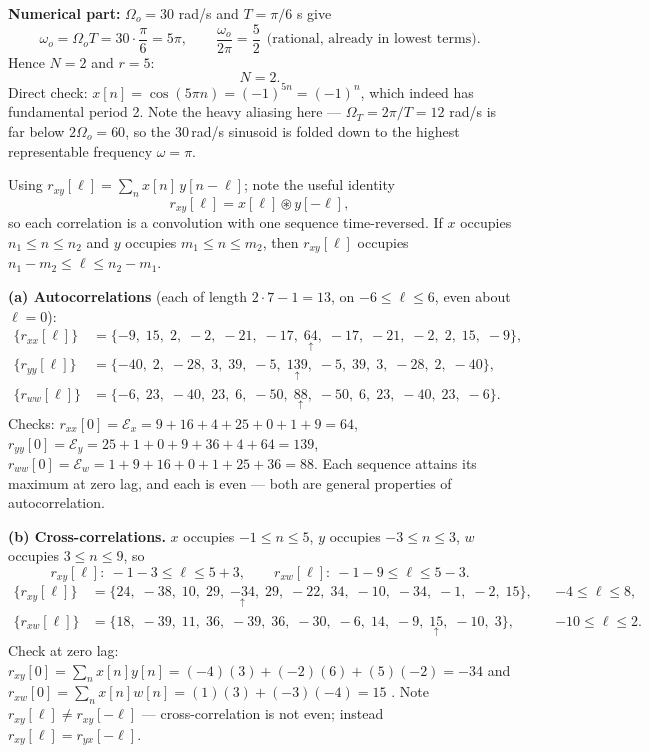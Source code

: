 \textbf{Numerical part:} $\Omega_o=30$ rad/s and $T=\pi/6$ s give
\[
\omega_o=\Omega_o T=30\cdot\frac{\pi}{6}=5\pi,
\qquad \frac{\omega_o}{2\pi}=\frac{5}{2}\ \ \text{(rational, already in lowest terms)} .
\]
Hence $N=2$ and $r=5$:
\[
\boxed{\;N=2 .\;}
\]
Direct check: $x[n]=\cos(5\pi n)=(-1)^{5n}=(-1)^{n}$, which indeed has fundamental period 2.
Note the heavy aliasing here --- $\Omega_T=2\pi/T=12$ rad/s is far below $2\Omega_o=60$, so
the $30$\,rad/s sinusoid is folded down to the highest representable frequency
$\omega=\pi$.


Using $r_{xy}[\ell]=\sum_n x[n]\,y[n-\ell]$; note the useful identity
\[
r_{xy}[\ell]=x[\ell]\circledast y[-\ell],
\]
so each correlation is a convolution with one sequence time-reversed. If $x$ occupies
$n_1\le n\le n_2$ and $y$ occupies $m_1\le n\le m_2$, then $r_{xy}[\ell]$ occupies
$n_1-m_2\le \ell\le n_2-m_1$.

\textbf{(a) Autocorrelations} (each of length $2\cdot7-1=13$, on $-6\le\ell\le 6$, even about
$\ell=0$):
\[
\boxed{
\begin{aligned}
\{r_{xx}[\ell]\}&=\{-9,\;15,\;2,\;-2,\;-21,\;-17,\;\underset{\uparrow}{64},\;-17,\;-21,\;-2,\;2,\;15,\;-9\},\\
\{r_{yy}[\ell]\}&=\{-40,\;2,\;-28,\;3,\;39,\;-5,\;\underset{\uparrow}{139},\;-5,\;39,\;3,\;-28,\;2,\;-40\},\\
\{r_{ww}[\ell]\}&=\{-6,\;23,\;-40,\;23,\;6,\;-50,\;\underset{\uparrow}{88},\;-50,\;6,\;23,\;-40,\;23,\;-6\}.
\end{aligned}}
\]
Checks: $r_{xx}[0]=\mathcal{E}_x=9+16+4+25+0+1+9=64$,
$r_{yy}[0]=\mathcal{E}_y=25+1+0+9+36+4+64=139$,
$r_{ww}[0]=\mathcal{E}_w=1+9+16+0+1+25+36=88$. Each sequence attains its maximum at zero lag,
and each is even --- both are general properties of autocorrelation.

\textbf{(b) Cross-correlations.}
$x$ occupies $-1\le n\le5$, $y$ occupies $-3\le n\le3$, $w$ occupies $3\le n\le9$, so
\[
r_{xy}[\ell]:\ -1-3\le\ell\le 5+3,\qquad r_{xw}[\ell]:\ -1-9\le\ell\le 5-3 .
\]
\[
\boxed{
\begin{aligned}
\{r_{xy}[\ell]\}&=\{24,\;-38,\;10,\;29,\;\underset{\uparrow}{-34},\;29,\;-22,\;34,\;-10,\;-34,\;-1,\;-2,\;15\},
&& -4\le\ell\le 8,\\[3pt]
\{r_{xw}[\ell]\}&=\{18,\;-39,\;11,\;36,\;-39,\;36,\;-30,\;-6,\;14,\;-9,\;\underset{\uparrow}{15},\;-10,\;3\},
&& -10\le\ell\le 2 .
\end{aligned}}
\]
Check at zero lag: $r_{xy}[0]=\sum_n x[n]y[n]=(-4)(3)+(-2)(6)+(5)(-2)=-34$ \checkmark and
$r_{xw}[0]=\sum_n x[n]w[n]=(1)(3)+(-3)(-4)=15$ \checkmark.
Note $r_{xy}[\ell]\ne r_{xy}[-\ell]$ --- cross-correlation is not even; instead
$r_{xy}[\ell]=r_{yx}[-\ell]$.

